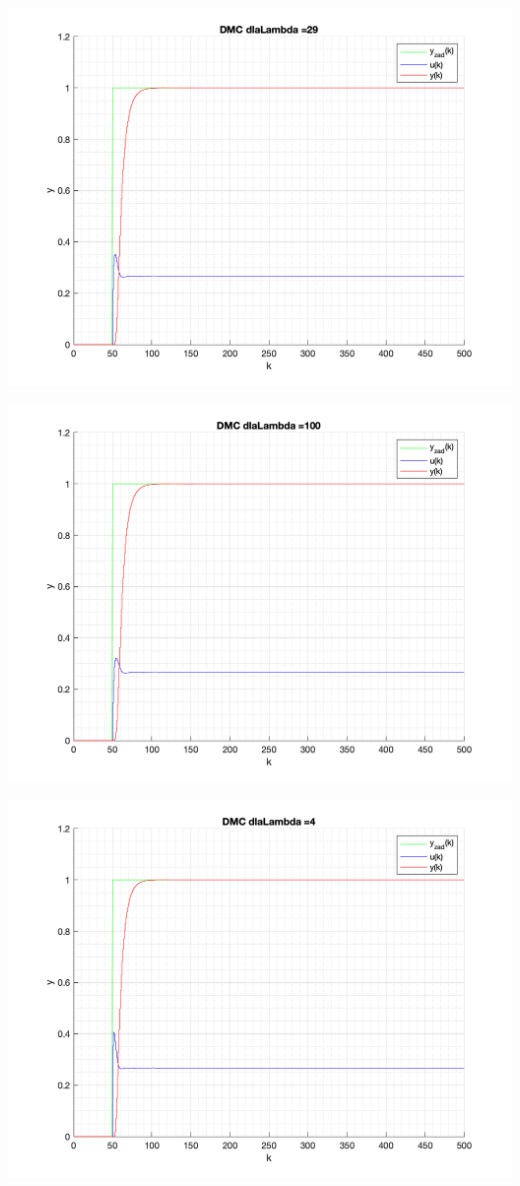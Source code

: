 \documentclass[a4paper, 11pt]{article}
\begin{document}
\begin{enumerate}
 \includegraphics[width=\linewidth]{./ModelsP4_Lambda/P4_DMC_Lambda_29_png.png} 
 
 \includegraphics[width=\linewidth]{./ModelsP4_Lambda/P4_DMC_Lambda_100_png.png} 
 
 \includegraphics[width=\linewidth]{./ModelsP4_Lambda/P4_DMC_Lambda_4_png.png} 
 

\end{enumerate}
\end{document}

